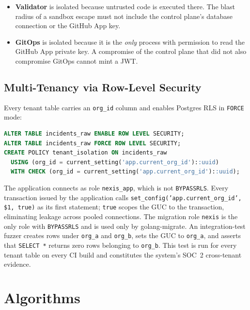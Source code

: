 \documentclass[manuscript,nonacm=true,screen=false,review=false]{acmart}
\begin{document}
\begin{itemize}
\item \textbf{Validator} is isolated because untrusted code is executed there. The blast radius of a sandbox escape must not include the control plane's database connection or the GitHub App key.
\item \textbf{GitOps} is isolated because it is the \emph{only} process with permission to read the GitHub App private key. A compromise of the control plane that did not also compromise GitOps cannot mint a JWT.
\end{itemize}

\subsection{Multi-Tenancy via Row-Level Security}\label{sec:rls}

Every tenant table carries an \texttt{org\_id} column and enables Postgres RLS in \texttt{FORCE} mode:

\begin{lstlisting}[language=SQL]
ALTER TABLE incidents_raw ENABLE ROW LEVEL SECURITY;
ALTER TABLE incidents_raw FORCE ROW LEVEL SECURITY;
CREATE POLICY tenant_isolation ON incidents_raw
  USING (org_id = current_setting('app.current_org_id')::uuid)
  WITH CHECK (org_id = current_setting('app.current_org_id')::uuid);
\end{lstlisting}

The application connects as role \texttt{nexis\_app}, which is not \texttt{BYPASSRLS}. Every transaction issued by the application calls \texttt{set\_config('app.current\_org\_id', \$1, true)} as its first statement; \texttt{true} scopes the GUC to the transaction, eliminating leakage across pooled connections. The migration role \texttt{nexis} is the only role with \texttt{BYPASSRLS} and is used only by golang-migrate. An integration-test fuzzer creates rows under \texttt{org\_a} and \texttt{org\_b}, sets the GUC to \texttt{org\_a}, and asserts that \texttt{SELECT *} returns zero rows belonging to \texttt{org\_b}. This test is run for every tenant table on every CI build and constitutes the system's SOC~2 cross-tenant evidence.

\section{Algorithms}\label{sec:alg}
\end{document}
